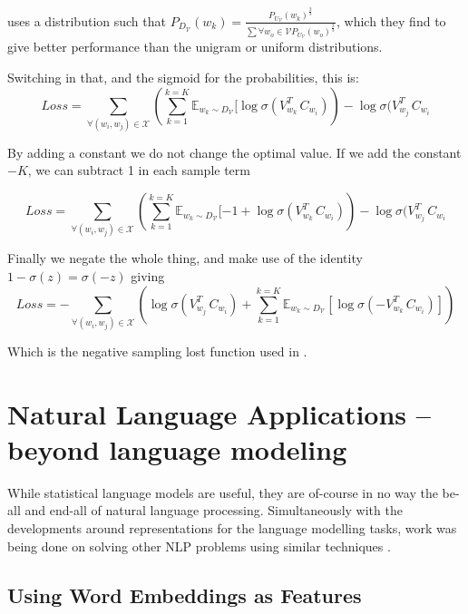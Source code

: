 \documentclass[parskip]{komatufte}
\begin{document}
 uses a distribution such that $P_{D_\mathcal{V}}(w_k) =  \frac{P_{U_\mathcal{V}}(w_k)^{\frac{2}{3}}}{\sum {\forall }w_o\in \mathcal{V} P_{U_\mathcal{V}}(w_o)^{\frac{2}{3}}}$,
which they find to give better performance than the unigram or uniform distributions.

Switching in that, and the sigmoid for the probabilities, this is:
\begin{equation}
Loss = \sum_{\forall (w_i,w_j)\in \mathcal{X}} 
\left(\sum_{k=1}^{k=K} \mathbb{E}_{w_k \sim D_{\mathcal{V}}} [\log \sigma(V_{w_k}^T\,C_{w_{i}}) \right)
-\log \sigma(V_{w_j}^T\,C_{w_{i}}
\end{equation}

By adding a constant we do not change the optimal value.
If we add the constant $-K$, we can subtract 1 in each sample term

\begin{equation}
Loss = \sum_{\forall (w_i,w_j)\in \mathcal{X}} 
\left(\sum_{k=1}^{k=K} \mathbb{E}_{w_k \sim D_{\mathcal{V}}} [-1 + \log \sigma(V_{w_k}^T\,C_{w_{i}}) \right)
-\log \sigma(V_{w_j}^T\,C_{w_{i}}
\end{equation}

Finally we negate the whole thing, and make use of the identity $1-\sigma(z) = \sigma(-z)$
giving
\begin{equation}
Loss = -\sum_{\forall (w_i,w_j)\in \mathcal{X}}
\left(
\log \sigma(V_{w_j}^T\,C_{w_{i}}) + \sum_{k=1}^{k=K} \mathbb{E}_{w_k \sim D_{\mathcal{V}}} [\log \sigma(-V_{w_k}^T\,C_{w_{i}})] 
\right)
\end{equation}

Which is the negative sampling lost function used in  .



\section{Natural Language Applications -- beyond language modeling}
While statistical language models are useful, they are of-course in no way the be-all and end-all of natural language processing.
Simultaneously with the developments around representations for the language modelling tasks, work was being done on solving other NLP problems using similar techniques .


\subsection{Using Word Embeddings as Features}
\end{document}
